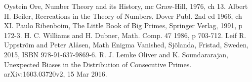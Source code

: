 \documentclass[10pt,twoside,a4paper]{amsart}
\begin{document}
\begin{thebibliography}{99}

Oystein Ore, Number Theory and its History, mc Graw-Hill, 1976, ch 13.
Albert H. Beiler, Recreations in the Theory of Numbers, Dover Publ. 2nd ed 1966, ch XI.
Paulo Ribenboim, The Little Book of Big Primes, Springer Verlag, 1991, p 172-3.
H. C. Williams and H. Dubner, Math. Comp. 47 1986, p 703-712.
Leif R. Uppstr\"om and Peter Al{\aa}sen, Math Enigma Vanished, Sj\"olanda, Fristad, Sweden, 2015, ISBN 978-91-637-9869-6.
R. J. Lemke Oliver and K. Soundararajan, Unexpected Biases in the Distribution of Consecutive Primes. arXiv:1603.03720v2, 15 Mar 2016.
\end{thebibliography}
\end{document}

